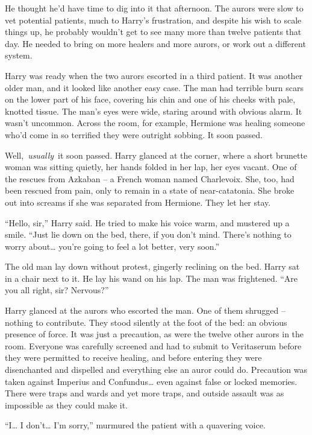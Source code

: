 He thought he'd have time to dig into it that afternoon. The aurors were
slow to vet potential patients, much to Harry's frustration, and despite
his wish to scale things up, he probably wouldn't get to see many more
than twelve patients that day. He needed to bring on more healers and
more aurors, or work out a different system.

Harry was ready when the two aurors escorted in a third patient. It was
another older man, and it looked like another easy case. The man had
terrible burn scars on the lower part of his face, covering his chin and
one of his cheeks with pale, knotted tissue. The man's eyes were wide,
staring around with obvious alarm. It wasn't uncommon. Across the room,
for example, Hermione was healing someone who'd come in so terrified
they were outright sobbing. It soon passed.

Well,~\emph{usually}~it soon passed. Harry glanced at the corner, where
a short brunette woman was sitting quietly, her hands folded in her lap,
her eyes vacant. One of the rescues from Azkaban -- a French woman named
Charlevoix. She, too, had been rescued from pain, only to remain in a
state of near-catatonia. She broke out into screams if she was separated
from Hermione. They let her stay.

``Hello, sir,'' Harry said. He tried to make his voice warm, and
mustered up a smile. ``Just lie down on the bed, there, if you don't
mind. There's nothing to worry about\ldots{} you're going to feel a lot
better, very soon.''

The old man lay down without protest, gingerly reclining on the bed.
Harry sat in a chair next to it. He lay his wand on his lap. The man was
frightened. ``Are you all right, sir? Nervous?''

Harry glanced at the aurors who escorted the man. One of them shrugged
-- nothing to contribute. They stood silently at the foot of the bed: an
obvious presence of force. It was just a precaution, as were the twelve
other aurors in the room. Everyone was carefully screened and had to
submit to Veritaserum before they were permitted to receive healing, and
before entering they were disenchanted and dispelled and everything else
an auror could do. Precaution was taken against Imperius and
Confundus\ldots{} even against false or locked memories. There were
traps and wards and yet more traps, and outside assault was as
impossible as they could make it.

``I\ldots{} I don't\ldots{} I'm sorry,'' murmured the patient with a
quavering voice.

